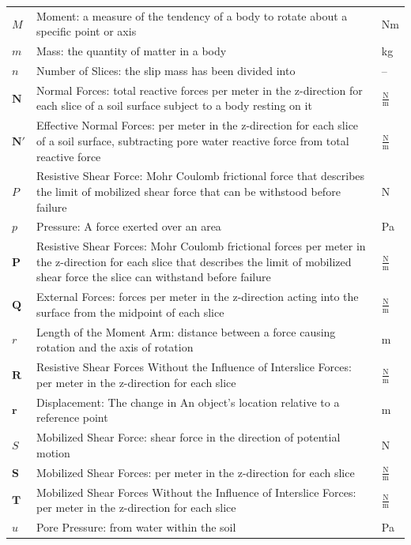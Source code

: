 \documentclass[12pt]{article}
\begin{document}
\begin{longtabu}{l X[l] l}
$M$ & Moment: a measure of the tendency of a body to rotate about a specific point or axis & Nm
\\
$m$ & Mass: the quantity of matter in a body & kg
\\
$n$ & Number of Slices: the slip mass has been divided into & --
\\
$\mathbf{N}$ & Normal Forces: total reactive forces per meter in the z-direction for each slice of a soil surface subject to a body resting on it & $\frac{\text{N}}{\text{m}}$
\\
$\mathbf{N'}$ & Effective Normal Forces: per meter in the z-direction for each slice of a soil surface, subtracting pore water reactive force from total reactive force & $\frac{\text{N}}{\text{m}}$
\\
$P$ & Resistive Shear Force: Mohr Coulomb frictional force that describes the limit of mobilized shear force that can be withstood before failure & N
\\
$p$ & Pressure: A force exerted over an area & Pa
\\
$\mathbf{P}$ & Resistive Shear Forces: Mohr Coulomb frictional forces per meter in the z-direction for each slice that describes the limit of mobilized shear force the slice can withstand before failure & $\frac{\text{N}}{\text{m}}$
\\
$\mathbf{Q}$ & External Forces: forces per meter in the z-direction acting into the surface from the midpoint of each slice & $\frac{\text{N}}{\text{m}}$
\\
$r$ & Length of the Moment Arm: distance between a force causing rotation and the axis of rotation & m
\\
$\mathbf{R}$ & Resistive Shear Forces Without the Influence of Interslice Forces: per meter in the z-direction for each slice & $\frac{\text{N}}{\text{m}}$
\\
$\mathbf{r}$ & Displacement: The change in An object's location relative to a reference point & m
\\
$S$ & Mobilized Shear Force: shear force in the direction of potential motion & N
\\
$\mathbf{S}$ & Mobilized Shear Forces: per meter in the z-direction for each slice & $\frac{\text{N}}{\text{m}}$
\\
$\mathbf{T}$ & Mobilized Shear Forces Without the Influence of Interslice Forces: per meter in the z-direction for each slice & $\frac{\text{N}}{\text{m}}$
\\
$u$ & Pore Pressure: from water within the soil & Pa
\\

\end{longtabu}
\end{document}
